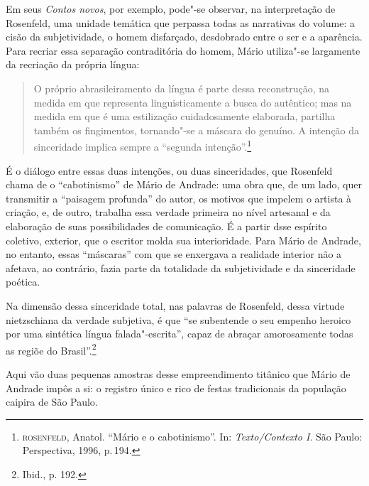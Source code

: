 Em seus \textit{Contos novos}, por exemplo, pode"-se observar, na interpretação de Rosenfeld, uma unidade temática que perpassa todas as narrativas do volume: a cisão da subjetividade, o homem disfarçado, desdobrado entre o ser e a aparência.
Para recriar essa separação contraditória do homem, Mário utiliza"-se largamente da recriação da própria língua:

\begin{quote}
O próprio abrasileiramento da língua é parte dessa reconstrução, na medida em que representa linguisticamente a busca do autêntico; mas na medida em que é uma estilização cuidadosamente elaborada, partilha também os fingimentos, tornando"-se a máscara do genuíno. A intenção da sinceridade implica sempre a ``segunda intenção''.\footnote{\textsc{rosenfeld}, Anatol. ``Mário e o cabotinismo''. In: \textit{Texto/Contexto I}. São Paulo: Perspectiva, 1996, p.\,194.}
\end{quote}

É o diálogo entre essas duas intenções, ou duas sinceridades, que Rosenfeld chama de o ``cabotinismo'' de Mário de Andrade: uma obra que, de um lado, quer transmitir a ``paisagem profunda'' do autor, os motivos que impelem o artista à criação, e, de outro, trabalha essa verdade primeira no nível artesanal e da elaboração de suas possibilidades de comunicação. É a partir dsse espírito coletivo, exterior,
que o escritor molda sua interioridade. Para Mário de Andrade, no entanto, essas ``máscaras'' com que se enxergava a realidade interior não a afetava, ao contrário, fazia parte da totalidade da subjetividade e da sinceridade poética.

Na dimensão dessa sinceridade total, nas palavras de Rosenfeld, dessa virtude nietzschiana da verdade subjetiva, é que ``se subentende o seu empenho heroico por uma sintética língua falada"-escrita'', capaz de abraçar amorosamente todas as regiõe do Brasil''.\footnote{Ibid., p. 192.}

Aqui vão duas pequenas amostras desse empreendimento titânico que Mário de Andrade impôs a si: o registro único e rico de festas tradicionais da população caipira de São Paulo.